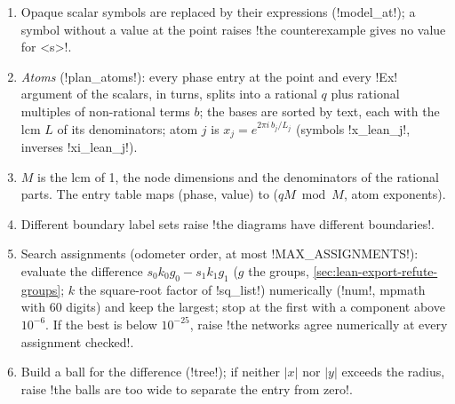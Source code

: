 {{{\begin{algorithm}\label{alg:lean-export-numeric}
\begin{enumerate}
\item Opaque scalar symbols are replaced by their expressions (\lexpy!model_at!); a symbol without
a value at the point raises \lexcode!the counterexample gives no value for <s>!.
\item \emph{Atoms} (\lexpy!plan_atoms!): every phase entry at the point and every \lexpy!Ex! argument
of the scalars, in turns, splits into a rational $q$ plus rational multiples of non-rational
terms $b$; the bases are sorted by text, each with the lcm $L$ of its denominators; atom $j$ is
$x_j = e^{2\pi i\,b_j/L_j}$ (symbols \lexcode!x_lean_j!, inverses \lexcode!xi_lean_j!).
\item $M$ is the lcm of 1, the node dimensions and the denominators of the rational parts. The
entry table maps (phase, value) to ($qM \bmod M$, atom exponents).
\item Different boundary label sets raise \lexcode!the diagrams have different boundaries!.
\item Search assignments (odometer order, at most \lexpy!MAX_ASSIGNMENTS!): evaluate the difference
$s_0k_0g_0 - s_1k_1g_1$ ($g$ the groups, \cref{sec:lean-export-refute-groups}; $k$ the
square-root factor of \lexpy!sq_list!) numerically (\lexpy!num!, mpmath with 60 digits) and keep the
largest; stop at the first with a component above $10^{-6}$. If the best is below $10^{-25}$,
raise \lexcode!the networks agree numerically at every assignment checked!.
\item Build a ball for the difference (\lexpy!tree!); if neither $|x|$ nor $|y|$ exceeds the radius,
raise \lexcode!the balls are too wide to separate the entry from zero!.
\end{enumerate}
\end{algorithm}

}}}

